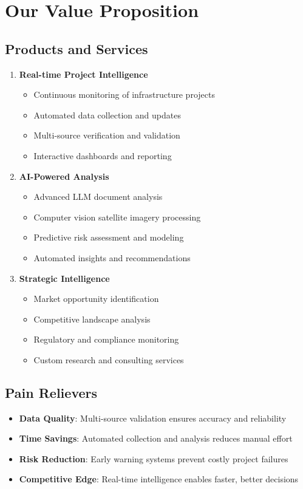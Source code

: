 \documentclass[business]{../templates/infraradar-main}
\begin{document}
\section{Our Value Proposition}

\subsection{Products and Services}
\begin{enumerate}
    \item \textbf{Real-time Project Intelligence}
    \begin{itemize}
        \item Continuous monitoring of infrastructure projects
        \item Automated data collection and updates
        \item Multi-source verification and validation
        \item Interactive dashboards and reporting
    \end{itemize}
    
    \item \textbf{AI-Powered Analysis}
    \begin{itemize}
        \item Advanced LLM document analysis
        \item Computer vision satellite imagery processing
        \item Predictive risk assessment and modeling
        \item Automated insights and recommendations
    \end{itemize}
    
    \item \textbf{Strategic Intelligence}
    \begin{itemize}
        \item Market opportunity identification
        \item Competitive landscape analysis
        \item Regulatory and compliance monitoring
        \item Custom research and consulting services
    \end{itemize}
\end{enumerate}

\subsection{Pain Relievers}
\begin{itemize}
    \item \textbf{Data Quality}: Multi-source validation ensures accuracy and reliability
    \item \textbf{Time Savings}: Automated collection and analysis reduces manual effort
    \item \textbf{Risk Reduction}: Early warning systems prevent costly project failures
    \item \textbf{Competitive Edge}: Real-time intelligence enables faster, better decisions
\end{itemize}
\end{document}
